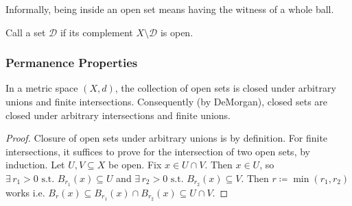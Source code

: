 \documentclass[14pt,oneside]{extarticle}
\begin{document}
Informally, being inside an open set means having the witness of a whole ball.

\begin{definition*}
  Call a set $\mathscr{D}$  if its complement $X \setminus \mathscr{D}$ is open.
\end{definition*}

\subsubsection{Permanence Properties}
In a metric space $(X,d)$, the collection of open sets is closed under arbitrary unions and finite intersections. Consequently (by DeMorgan), closed sets are closed under arbitrary intersections and finite unions.
\begin{proof}
  Closure of open sets under arbitrary unions is by definition. For finite intersections, it suffices to prove for the intersection of two open sets, by induction. Let $U, V \subseteq X$ be open. Fix $x \in U \cap V$. Then $x \in U$, so $\exists \, r_1 >0 \text{ s.t. } B_{r_1}(x) \subseteq U$ and $\exists \, r_2 > 0 \text{ s.t. } B_{r_2}(x) \subseteq V$. Then $r \coloneqq \min(r_1,r_2)$ works i.e. $B_r(x) \subseteq B_{r_1}(x) \cap B_{r_2}(x) \subseteq U \cap V$.

  \pic
\end{proof}
\end{document}
